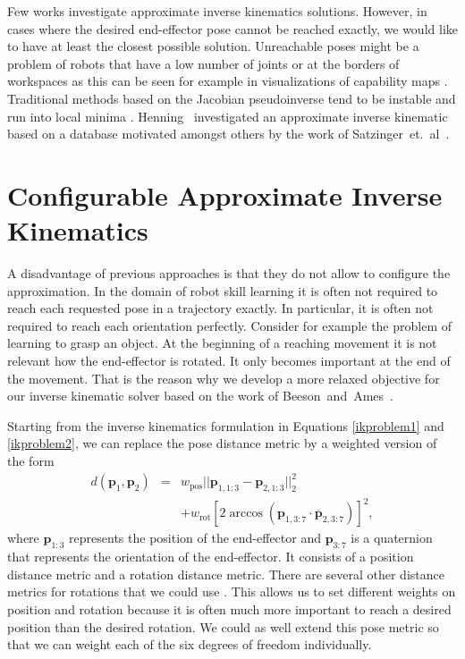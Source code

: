 \documentclass{article}
\begin{document}
Few works investigate approximate inverse kinematics solutions.
However, in cases where the desired end-effector pose cannot be reached
exactly, we would like to have at least the closest possible solution.
Unreachable poses might be a problem of robots that have a low number of
joints \cite{Henning2014} or at the borders of workspaces as this can be
seen for example in visualizations of capability maps \cite{Zacharias2007}.
Traditional methods based on the Jacobian pseudoinverse tend to be
instable and run into local minima \cite{Nilsson2009,Henning2014}.
Henning~ investigated an approximate inverse
kinematic based on a database motivated amongst others by
the work of Satzinger~et.~al~.

\section{Configurable Approximate Inverse Kinematics}

A disadvantage of previous approaches is that they do not allow to
configure the approximation.
In the domain of robot skill learning it is often not required to reach
each requested pose in a trajectory exactly. In particular, it is often
not required to reach each orientation perfectly.
Consider for example the problem of learning to grasp an object. At the
beginning of a reaching movement it is not relevant how the end-effector
is rotated. It only becomes important at the end of the movement.
That is the reason why we develop a more relaxed objective for our
inverse kinematic solver based on the work of
Beeson~and~Ames~.

Starting from the inverse kinematics formulation in Equations
\ref{ikproblem1} and \ref{ikproblem2}, we can replace the pose distance metric
by a weighted version of the form
\begin{eqnarray*}
d(\boldsymbol{p}_1, \boldsymbol{p}_2) &=&
  w_{\text{pos}}||\boldsymbol{p}_{1, 1:3} - \boldsymbol{p}_{2, 1:3}||_2^2\\
&&
  + w_{\text{rot}} \left[ 2 \arccos\left(\boldsymbol{p}_{1, 3:7} \cdot \overline{\boldsymbol{p}}_{2, 3:7}\right)\right]^2,
\end{eqnarray*}
where $\boldsymbol{p}_{1:3}$ represents the position of the end-effector and
$\boldsymbol{p}_{3:7}$ is a quaternion that represents the orientation of the
end-effector.
It consists of a position distance metric and a rotation distance metric.
There are several other distance metrics for rotations that we could use
\cite{Huynh2009}. This allows us to set different weights on position and
rotation because it is often much more important to reach a desired position
than the desired rotation. We could as well extend this pose metric so that
we can weight each of the six degrees of freedom individually.
\end{document}
